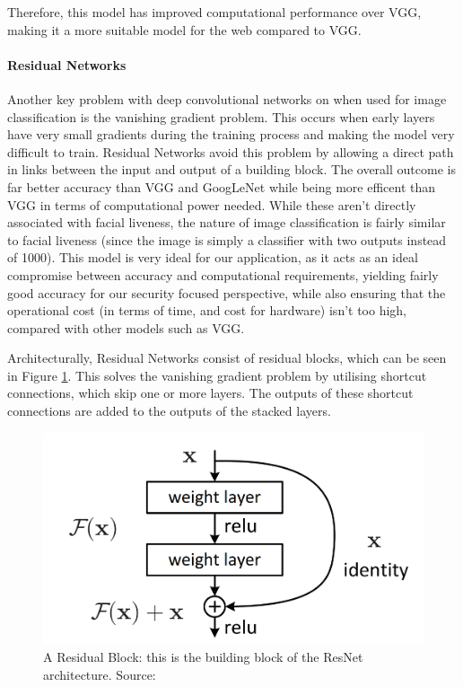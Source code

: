 \documentclass[11pt,a4paper]{article}
\begin{document}
        Therefore, this model has improved computational performance over VGG, making it a more suitable model for the web compared to VGG. \cite{DeepNeuralNetworkDeployability}
        
        \paragraph{Residual Networks}
        Another key problem with deep convolutional networks on when used for image classification is the vanishing gradient problem. This occurs when early layers have very small gradients during the training process and
        making the model very difficult to train. Residual Networks avoid this problem by allowing a direct path in links between the input and output of a building block.
        The overall outcome is far better accuracy than VGG and GoogLeNet while being more efficent than VGG in terms of computational power needed. \cite{DeepResidualNetworks}
        While these aren't directly associated with facial liveness, the nature of image classification is fairly similar to facial liveness (since the image is simply a classifier with two outputs instead of 1000).
        This model is very ideal for our application, as it acts as an ideal compromise between accuracy and computational requirements, yielding fairly good accuracy for our security focused perspective, while also
        ensuring that the operational cost (in terms of time, and cost for hardware) isn't too high, compared with other models such as VGG.

        Architecturally, Residual Networks consist of residual blocks, which can be seen in Figure \ref{ResidualBlock}. This solves the vanishing gradient problem by utilising shortcut
        connections, which skip one or more layers. The outputs of these shortcut connections are added to the outputs of the stacked layers.
        \begin{figure}
            \includegraphics[width=.7\linewidth]{ResidualBlock.png}
            \caption{A Residual Block: this is the building block of the ResNet architecture. Source: \cite{DeepResidualNetworks}}
            \label{ResidualBlock}
        \end{figure}
\end{document}
